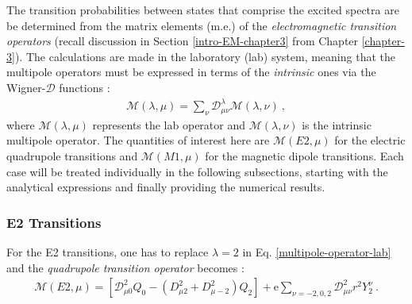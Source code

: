 The transition probabilities between states that comprise the excited spectra are be determined from the matrix elements (m.e.) of the \emph{electromagnetic transition operators} (recall discussion in Section \ref{intro-EM-chapter3} from Chapter \ref{chapter-3}). The calculations are made in the laboratory (lab) system, meaning that the multipole operators must be expressed in terms of the \emph{intrinsic} ones via the Wigner-$\mathcal{D}$ functions \cite{toki1975asymmetric,bohr1998nuclear}:
\begin{align}
    \mathcal{M}(\lambda,\mu)=\sum_\nu\mathcal{D}_{\mu\nu}^\lambda\mathcal{M}(\lambda,\nu)\ ,
    \label{multipole-operator-lab}
\end{align}
where $\mathcal{M}(\lambda,\mu)$ represents the lab operator and $\mathcal{M}(\lambda,\nu)$ is the intrinsic multipole operator. The quantities of interest here are $\mathcal{M}(E2,\mu)$ for the electric quadrupole transitions and $\mathcal{M}(M1,\mu)$ for the magnetic dipole transitions. Each case will be treated individually in the following subsections, starting with the analytical expressions and finally providing the numerical results.

\subsubsection{E2 Transitions}

For the E2 transitions, one has to replace $\lambda=2$ in Eq. \ref{multipole-operator-lab} and the \emph{quadrupole transition operator} becomes \cite{toki1975asymmetric,raduta2020towards}:
\begin{align}
    \mathcal{M}(E2,\mu)=\left[\mathcal{D}_{\mu0}^2Q_0-\left(D_{\mu 2}^2+D_{\mu -2}^2\right)Q_2\right]+\mathrm{e}\sum_{\nu=-2,0,2}\mathcal{D}_{\mu\nu}^2r^2Y_2^\nu\ .
    \label{electric-quadrupole-operator-lab}
\end{align}

